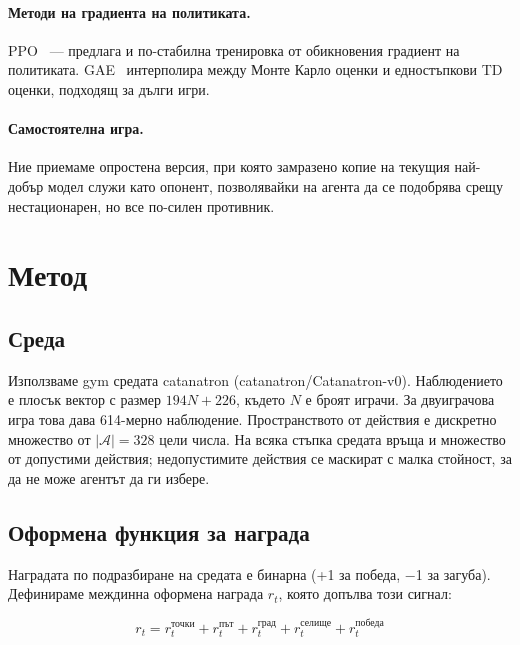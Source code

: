 \documentclass[11pt,a4paper]{article}
\begin{document}
\paragraph{Методи на градиента на политиката.}
PPO~\citep{schulman2017proximal} --- предлага и по-стабилна тренировка от
обикновения градиент на политиката. GAE~\citep{schulman2015high} интерполира между
Монте Карло оценки и едностъпкови TD оценки, подходящ за дълги игри.

\paragraph{Самостоятелна игра.}
Ние приемаме опростена версия, при
която замразено копие на текущия най-добър модел служи като опонент, позволявайки
на агента да се подобрява срещу нестационарен, но все по-силен противник.

\section{Метод}

\subsection{Среда}

Използваме gym средата {catanatron} ({catanatron/Catanatron-v0}).
Наблюдението е плосък вектор с размер $194N + 226$, където $N$ е броят
играчи. За двуиграчова игра това дава 614-мерно наблюдение. Пространството от
действия е дискретно множество от $|\mathcal{A}| = 328$ цели числа. На всяка
стъпка средата връща и множество от {допустими действия}; недопустимите
действия се маскират с малка стойност, за да не може агентът да ги избере.

\subsection{Оформена функция за награда}

Наградата по подразбиране на средата е бинарна (+1 за победа, $-$1 за загуба).
Дефинираме междинна оформена награда $r_t$, която допълва този сигнал:

\begin{equation}
r_t = r_t^{\text{точки}} + r_t^{\text{път}} + r_t^{\text{град}} +
      r_t^{\text{селище}} + r_t^{\text{победа}}
\end{equation}
\end{document}
